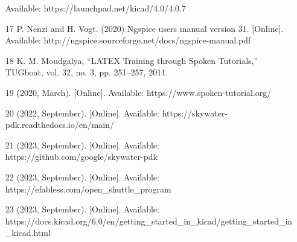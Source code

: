 \begin{enumerate}
Available: https://launchpad.net/kicad/4.0/4.0.7 
\item   [17]   P. Nenzi and H. Vogt. (2020) Ngspice users manual version 31. [Online]. \\
Available: http://ngspice.sourceforge.net/docs/ngspice-manual.pdf 
\item [18]   K. M. Moudgalya, “LATEX Training through Spoken Tutorials,” TUGboat, vol. 32, no. 3, pp. 251–257, 2011. 
\item [19]   (2020, March). [Online]. Available: https://www.spoken-tutorial.org/ 
\item [20]   (2022, September). [Online]. Available: https://skywater-pdk.readthedocs.io/en/main/
\item [21]   (2023, September). [Online]. Available: https://github.com/google/skywater-pdk
\item [22]   (2023, September). [Online]. Available: https://efabless.com/open\_shuttle\_program
\item [23] (2023, September). [Online]. Available: https://docs.kicad.org/6.0/en/getting\_started\_in\_kicad/getting\_started\_in\_kicad.html
\end{enumerate}
